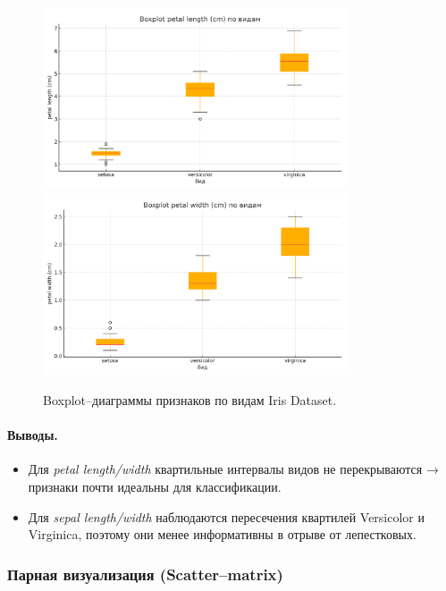 \begin{figure}[H]
  \ContinuedFloat
  \centering
  \includegraphics[width=0.8\textwidth]{images/box_petal_length_cm_cb2.png}\\[6pt]
  \includegraphics[width=0.8\textwidth]{images/box_petal_width_cm_cb2.png}
  \caption{Boxplot–диаграммы признаков по видам Iris Dataset.}
\end{figure}

\paragraph{Выводы.}
\begin{itemize}
  \item Для \emph{petal length/width} квартильные интервалы видов не перекрываются → признаки почти идеальны для классификации.
  \item Для \emph{sepal length/width} наблюдаются пересечения квартилей Versicolor и Virginica, поэтому они менее информативны в отрыве от лепестковых.
\end{itemize}

\subsubsection{Парная визуализация (Scatter–matrix)}

